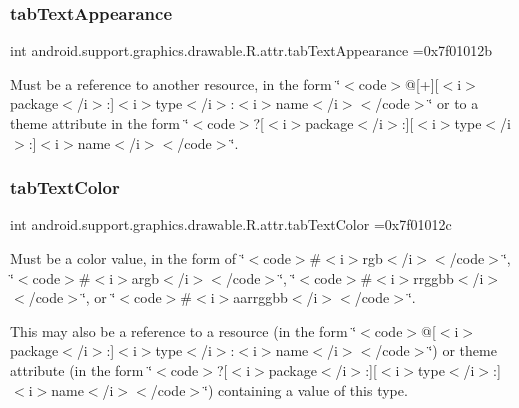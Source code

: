 \subsubsection{\texorpdfstring{tab\+Text\+Appearance}{tabTextAppearance}}
{\footnotesize\ttfamily int android.\+support.\+graphics.\+drawable.\+R.\+attr.\+tab\+Text\+Appearance =0x7f01012b\hspace{0.3cm}{\ttfamily [static]}}

Must be a reference to another resource, in the form \char`\"{}$<$code$>$@\mbox{[}+\mbox{]}\mbox{[}$<$i$>$package$<$/i$>$\+:\mbox{]}$<$i$>$type$<$/i$>$\+:$<$i$>$name$<$/i$>$$<$/code$>$\char`\"{} or to a theme attribute in the form \char`\"{}$<$code$>$?\mbox{[}$<$i$>$package$<$/i$>$\+:\mbox{]}\mbox{[}$<$i$>$type$<$/i$>$\+:\mbox{]}$<$i$>$name$<$/i$>$$<$/code$>$\char`\"{}. \mbox{\label{classandroid_1_1support_1_1graphics_1_1drawable_1_1R_1_1attr_af43ba39aeb9e771d37055b789021e1b1}} 
\subsubsection{\texorpdfstring{tab\+Text\+Color}{tabTextColor}}
{\footnotesize\ttfamily int android.\+support.\+graphics.\+drawable.\+R.\+attr.\+tab\+Text\+Color =0x7f01012c\hspace{0.3cm}{\ttfamily [static]}}

Must be a color value, in the form of \char`\"{}$<$code$>$\#$<$i$>$rgb$<$/i$>$$<$/code$>$\char`\"{}, \char`\"{}$<$code$>$\#$<$i$>$argb$<$/i$>$$<$/code$>$\char`\"{}, \char`\"{}$<$code$>$\#$<$i$>$rrggbb$<$/i$>$$<$/code$>$\char`\"{}, or \char`\"{}$<$code$>$\#$<$i$>$aarrggbb$<$/i$>$$<$/code$>$\char`\"{}. 

This may also be a reference to a resource (in the form \char`\"{}$<$code$>$@\mbox{[}$<$i$>$package$<$/i$>$\+:\mbox{]}$<$i$>$type$<$/i$>$\+:$<$i$>$name$<$/i$>$$<$/code$>$\char`\"{}) or theme attribute (in the form \char`\"{}$<$code$>$?\mbox{[}$<$i$>$package$<$/i$>$\+:\mbox{]}\mbox{[}$<$i$>$type$<$/i$>$\+:\mbox{]}$<$i$>$name$<$/i$>$$<$/code$>$\char`\"{}) containing a value of this type. \mbox{\label{classandroid_1_1support_1_1graphics_1_1drawable_1_1R_1_1attr_a6beee6f2a747fa1b4ca1b2b22a1bcf2b}} 
